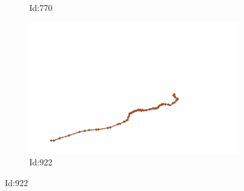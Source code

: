 \documentclass[12pt,twoside]{report}
\begin{document}
\begin{figure}
\begin{subfigure}[b]{0.20\textwidth}
\caption{Id:770}
\end{subfigure}
\begin{subfigure}[b]{0.20\textwidth}
\centering
\includegraphics[width=\textwidth]{../../trajectories/922.png}
\caption{Id:922}
\end{subfigure}
\end{figure}
\end{document}
